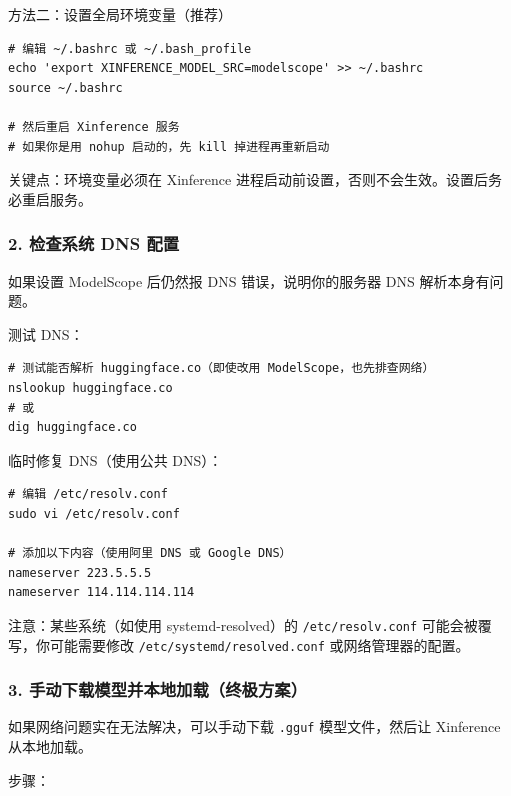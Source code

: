 \documentclass[12pt,UTF8]{ctexbook}
\begin{document}
方法二：设置全局环境变量（推荐）

\begin{lstlisting}
# 编辑 ~/.bashrc 或 ~/.bash_profile
echo 'export XINFERENCE_MODEL_SRC=modelscope' >> ~/.bashrc
source ~/.bashrc

# 然后重启 Xinference 服务
# 如果你是用 nohup 启动的，先 kill 掉进程再重新启动
\end{lstlisting}

关键点：环境变量必须在 Xinference 进程启动前设置，否则不会生效。设置后务必重启服务。

\subsubsection{2. 检查系统 DNS 配置}

如果设置 ModelScope 后仍然报 DNS 错误，说明你的服务器 DNS 解析本身有问题。

测试 DNS：

\begin{lstlisting}
# 测试能否解析 huggingface.co（即使改用 ModelScope，也先排查网络）
nslookup huggingface.co
# 或
dig huggingface.co
\end{lstlisting}

临时修复 DNS（使用公共 DNS）：

\begin{lstlisting}
# 编辑 /etc/resolv.conf
sudo vi /etc/resolv.conf

# 添加以下内容（使用阿里 DNS 或 Google DNS）
nameserver 223.5.5.5
nameserver 114.114.114.114
\end{lstlisting}

注意：某些系统（如使用 systemd-resolved）的 \texttt{/etc/resolv.conf} 可能会被覆写，你可能需要修改 \texttt{/etc/systemd/resolved.conf} 或网络管理器的配置。

\subsubsection{3. 手动下载模型并本地加载（终极方案）}

如果网络问题实在无法解决，可以手动下载 \texttt{.gguf} 模型文件，然后让 Xinference 从本地加载。

步骤：
\end{document}

